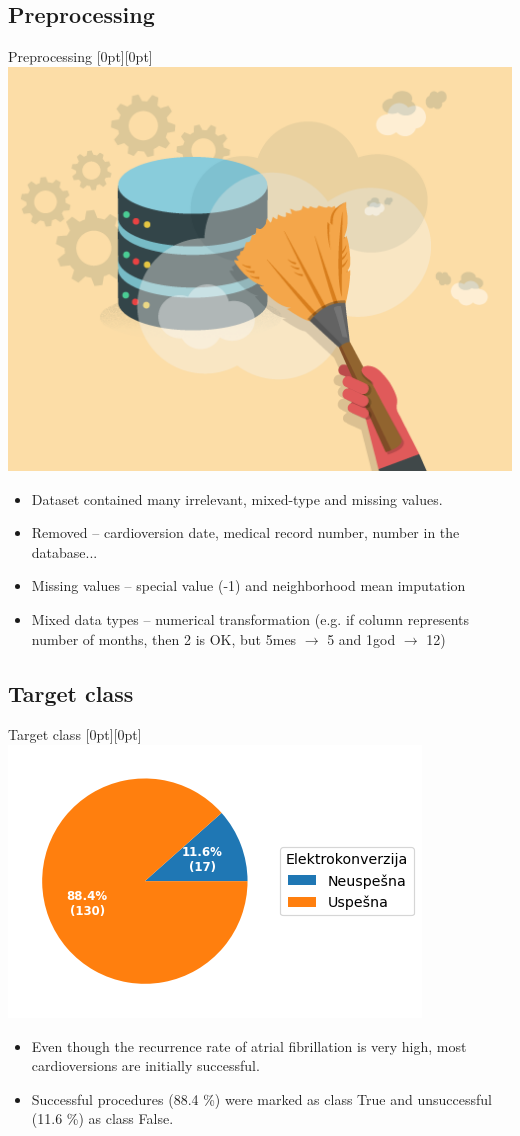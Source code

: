 \documentclass[hyperref={bookmarks=false}]{beamer}
\newcommand{\lenitem}[2][.51\linewidth]{\parbox[t]{#1}{\strut #2\strut}}
\begin{document}
\subsection{Preprocessing}
\begin{frame}{Preprocessing}
\mbox{}\hfill\raisebox{-\height}[0pt][0pt]{\includegraphics[width=.42\linewidth]{../slike/prep.png}}
\vspace*{-\baselineskip}

\begin{itemize}
    \item \lenitem{Dataset contained many irrelevant, mixed-type and missing values.}

    \item \lenitem{Removed -- cardioversion date, medical record number, number in the database...}

    \item \lenitem{Missing values -- special value (-1) and neighborhood mean imputation}

    \item \lenitem{Mixed data types -- numerical transformation (e.g. if column represents number of months, then 2 is OK, but 5mes $\rightarrow$ 5 and 1god $\rightarrow$ 12)}
\end{itemize}
\end{frame}

\subsection{Target class}
\begin{frame}{Target class}
\mbox{}\hfill\raisebox{-\height}[0pt][0pt]{\includegraphics[width=.42\linewidth]{../slike/target.png}}
\vspace*{-\baselineskip}

\begin{itemize}
    \item \lenitem{Even though the recurrence rate of atrial fibrillation is very high, most cardioversions are initially successful.}

    \item \lenitem{Successful procedures (88.4 \%) were marked as class True and unsuccessful (11.6 \%) as class False.}
\end{itemize}
\end{frame}
\end{document}
